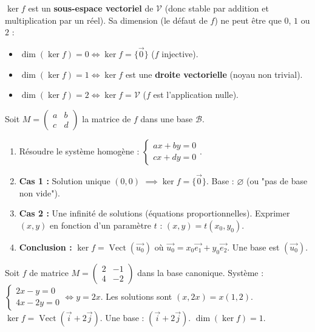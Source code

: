 \documentclass[11pt]{article}
\newcommand{\cle}[1]{{\popxbold\color{popdark}#1}}
\begin{document}
\begin{propriete}
$\ker f$ est un \textbf{sous-espace vectoriel} de $\mathcal{V}$ (donc stable par addition et multiplication par un réel).
Sa dimension (le \cle{défaut} de $f$) ne peut être que $0$, $1$ ou $2$ :
\begin{itemize}
  \item $\dim(\ker f) = 0 \iff \ker f = \{\vec{0}\}$ ($f$ injective).
  \item $\dim(\ker f) = 1 \iff \ker f$ est une \textbf{droite vectorielle} (noyau non trivial).
  \item $\dim(\ker f) = 2 \iff \ker f = \mathcal{V}$ ($f$ est l'application nulle).
\end{itemize}
\end{propriete}

\begin{methode}
Soit $M = \begin{pmatrix} a & b \\ c & d \end{pmatrix}$ la matrice de $f$ dans une base $\mathcal{B}$.
\begin{enumerate}
  \item Résoudre le système homogène : $\begin{cases} ax + by = 0 \\ cx + dy = 0 \end{cases}$.
  \item \textbf{Cas 1 :} Solution unique $(0,0)$ $\implies \ker f = \{\vec{0}\}$. Base : $\varnothing$ (ou "pas de base non vide").
  \item \textbf{Cas 2 :} Une infinité de solutions (équations proportionnelles). Exprimer $(x,y)$ en fonction d'un paramètre $t$ : $(x,y) = t(x_0, y_0)$.
  \item \textbf{Conclusion :} $\ker f = \operatorname{Vect}(\vec{u_0})$ où $\vec{u_0} = x_0\vec{e_1}+y_0\vec{e_2}$. Une base est $(\vec{u_0})$.
\end{enumerate}
\end{methode}

\begin{exoresolu}
Soit $f$ de matrice $M = \begin{pmatrix} 2 & -1 \\ 4 & -2 \end{pmatrix}$ dans la base canonique.
\tcblower
Système : $\begin{cases} 2x - y = 0 \\ 4x - 2y = 0 \end{cases} \iff y = 2x$.
Les solutions sont $(x, 2x) = x(1, 2)$.
$\ker f = \operatorname{Vect}(\vec{i} + 2\vec{j})$. Une base : $(\vec{i} + 2\vec{j})$. $\dim(\ker f) = 1$.
\end{exoresolu}
\end{document}
